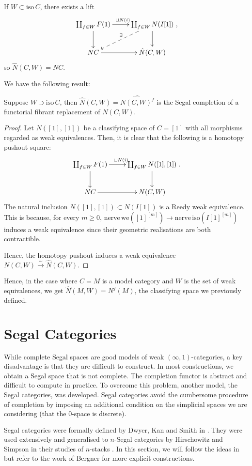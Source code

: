 \begin{refsection}
If $W\subset\mathrm{iso}\,C$, there exists a lift
$$\xymatrix{\coprod_{f\in W}F(1)\ar[r]^{\sqcup N(i)}\ar[d]&\coprod_{f\in W}N(I[1])\ar[d]\ar@{-->}[dl]_{\exists}\\NC\ar[r]&\hat N(C,W)},$$
so $\hat N(C,W)=NC$.

We have the following result:
\begin{prop}
Suppose $W\supset\mathrm{iso}\,C$, then $\hat N(C,W)=\widehat{N(C,W)^f}$ is the Segal completion of a functorial fibrant replacement of $N(C,W)$.
\end{prop}
\begin{proof}
Let $N([1],[1])$ be a classifying space of $C=[1]$ with all morphisms regarded as weak equivalences. Then, it is clear that the following is a homotopy pushout square:
$$\xymatrix{\coprod_{f\in W}F(1)\ar[r]^{\sqcup N(i)}\ar[d]&\coprod_{f\in W}N([1],[1])\ar[d]\\NC\ar[r]&N(C,W)}.$$
The natural inclusion $N([1],[1])\subset N(I[1])$ is a Reedy weak equivalence. This is because, for every $m\ge 0$, $\mathrm{nerve}\,\mathrm{we}([1]^{[m]})\to\mathrm{nerve}\,\mathrm{iso}(I[1]^{[m]})$ induces a weak equivalence since their geometric realisations are both contractible.

Hence, the homotopy pushout induces a weak equivalence $N(C,W)\xrightarrow\sim\hat N(C,W)$.
\end{proof}

Hence, in the case where $C=M$ is a model category and $W$ is the set of weak equivalences, we get $\hat N(M,W)=N^f(M)$, the classifying space we previously defined.


\section{Segal Categories}
While complete Segal spaces are good models of weak $(\infty,1)$-categories, a key disadvantage is that they are difficult to construct. In most constructions, we obtain a Segal space that is not complete. The completion functor is abstract and difficult to compute in practice. To overcome this problem, another model, the Segal categories, was developed. Segal categories avoid the cumbersome procedure of completion by imposing an additional condition on the simplicial spaces we are considering (that the 0-space is discrete).

Segal categories were formally defined by Dwyer, Kan and Smith in \cite{dks}. They were used extensively and generalised to $n$-Segal categories by Hirschowitz and Simpson in their studies of $n$-stacks \cite{hs}. In this section, we will follow the ideas in \cite{hs} but refer to the work of Bergner \cite{bergner2} for more explicit constructions.


\end{refsection}
